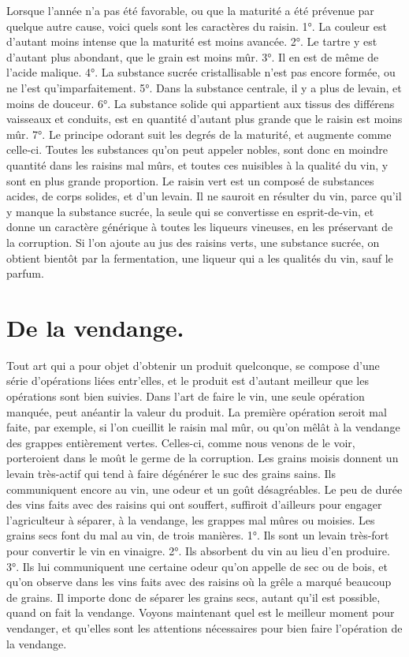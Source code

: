 Lorsque l'année n'a pas été favorable, ou que la maturité a été prévenue par quelque autre cause, voici quels sont les caractères du raisin.\setcounter{page}{84} 1°. La couleur est d'autant moins intense que la maturité est moins avancée.
2°. Le tartre y est d'autant plus abondant, que le grain est moins mûr.
3°. Il en est de même de l'acide malique.
4°. La substance sucrée cristallisable n'est pas encore formée, ou ne l'est qu'imparfaitement.
5°. Dans la substance centrale, il y a plus de levain, et moins de douceur.
6°. La substance solide qui appartient aux tissus des différens vaisseaux et conduits, est en quantité d'autant plus grande que le raisin est moins mûr.
7°. Le principe odorant suit les degrés de la maturité, et augmente comme celle-ci.
Toutes les substances qu'on peut appeler nobles, sont donc en moindre quantité dans les raisins mal mûrs, et toutes ces nuisibles à la qualité du vin, y sont en plus grande proportion.
Le raisin vert est un composé de substances acides, de corps solides, et d'un levain. Il ne sauroit en résulter du vin, parce qu'il y manque la substance sucrée, la seule qui se convertisse en esprit-de-vin, et donne un caractère générique à toutes les liqueurs vineuses, en les préservant de la corruption.\setcounter{page}{85} Si l'on ajoute au jus des raisins verts, une substance sucrée, on obtient bientôt par la fermentation, une liqueur qui a les qualités du vin, sauf le parfum.
\section{De la vendange.}
Tout art qui a pour objet d'obtenir un produit quelconque, se compose d'une série d'opérations liées entr'elles, et le produit est d'autant meilleur que les opérations sont bien suivies. Dans l'art de faire le vin, une seule opération manquée, peut anéantir la valeur du produit.
La première opération seroit mal faite, par exemple, si l'on cueillit le raisin mal mûr, ou qu'on mêlât à la vendange des grappes entièrement vertes. Celles-ci, comme nous venons de le voir, porteroient dans le moût le germe de la corruption. Les grains moisis donnent un levain très-actif qui tend à faire dégénérer le suc des grains sains. Ils communiquent encore au vin, une odeur et un goût désagréables. Le peu de durée des vins faits avec des raisins qui ont souffert, suffiroit d'ailleurs pour engager l'agriculteur à séparer, à la vendange, les grappes mal mûres ou moisies.
Les grains secs font du mal au vin, de trois\setcounter{page}{86} manières. 1°. Ils sont un levain très-fort pour convertir le vin en vinaigre. 2°. Ils absorbent du vin au lieu d'en produire. 3°. Ils lui communiquent une certaine odeur qu'on appelle de sec ou de bois, et qu'on observe dans les vins faits avec des raisins où la grêle a marqué beaucoup de grains.
Il importe donc de séparer les grains secs, autant qu'il est possible, quand on fait la vendange. Voyons maintenant quel est le meilleur moment pour vendanger, et qu'elles sont les attentions nécessaires pour bien faire l'opération de la vendange.
